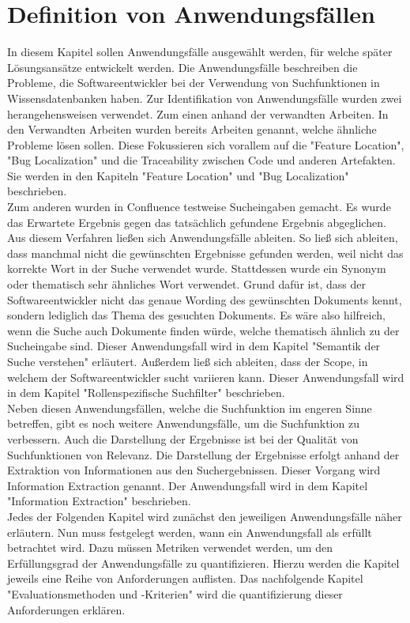 \chapter{Definition von Anwendungsfällen}
In diesem Kapitel sollen Anwendungsfälle ausgewählt werden, für welche später Lösungsansätze entwickelt werden.
Die Anwendungsfälle beschreiben die Probleme, die Softwareentwickler bei der Verwendung von Suchfunktionen in Wissensdatenbanken haben.
Zur Identifikation von Anwendungsfälle wurden zwei herangehensweisen verwendet.
Zum einen anhand der verwandten Arbeiten.
In den Verwandten Arbeiten wurden bereits Arbeiten genannt, welche ähnliche Probleme lösen sollen.
Diese Fokussieren sich vorallem auf die "Feature Location", "Bug Localization" und die Traceability zwischen Code und anderen Artefakten.
Sie werden in den Kapiteln "Feature Location" und "Bug Localization" beschrieben.\\

Zum anderen wurden in Confluence testweise Sucheingaben gemacht.
Es wurde das Erwartete Ergebnis gegen das tatsächlich gefundene Ergebnis abgeglichen.
Aus diesem Verfahren ließen sich Anwendungsfälle ableiten.
So ließ sich ableiten, dass manchmal nicht die gewünschten Ergebnisse gefunden werden, weil nicht das korrekte Wort in der Suche verwendet wurde.
Stattdessen wurde ein Synonym oder thematisch sehr ähnliches Wort verwendet.
Grund dafür ist, dass der Softwareentwickler nicht das genaue Wording des gewünschten Dokuments kennt, sondern lediglich das Thema des gesuchten Dokuments.
Es wäre also hilfreich, wenn die Suche auch Dokumente finden würde, welche thematisch ähnlich zu der Sucheingabe sind.
Dieser Anwendungsfall wird in dem Kapitel "Semantik der Suche verstehen" erläutert.
Außerdem ließ sich ableiten, dass der Scope, in welchem der Softwareentwickler sucht variieren kann.
Dieser Anwendungsfall wird in dem Kapitel "Rollenspezifische Suchfilter" beschrieben.\\

Neben diesen Anwendungsfällen, welche die Suchfunktion im engeren Sinne betreffen, gibt es noch weitere Anwendungsfälle, um die Suchfunktion zu verbessern.
Auch die Darstellung der Ergebnisse ist bei der Qualität von Suchfunktionen von Relevanz.
Die Darstellung der Ergebnisse erfolgt anhand der Extraktion von Informationen aus den Suchergebnissen.
Dieser Vorgang wird Information Extraction genannt.
Der Anwendungsfall wird in dem Kapitel "Information Extraction" beschrieben.\\

Jedes der Folgenden Kapitel wird zunächst den jeweiligen Anwendungsfälle näher erläutern.
Nun muss festgelegt werden, wann ein Anwendungsfall als erfüllt betrachtet wird.
Dazu müssen Metriken verwendet werden, um den Erfüllungsgrad der Anwendungsfälle zu quantifizieren.
Hierzu werden die Kapitel jeweils eine Reihe von Anforderungen auflisten.
Das nachfolgende Kapitel "Evaluationsmethoden und -Kriterien" wird die quantifizierung dieser Anforderungen erklären. 

